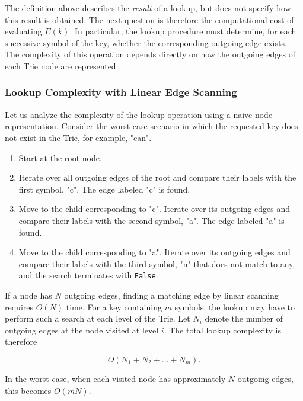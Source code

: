 \documentclass[pdflatex,sn-mathphys-num]{sn-jnl}%
\theoremstyle{thmstyleone}%
\theoremstyle{thmstyletwo}%
\theoremstyle{thmstylethree}%
\begin{document}
The definition above describes the \textit{result} of a lookup, but does not specify how
this result is obtained. The next question is therefore the computational cost of evaluating $E(k)$.
In particular, the lookup procedure must determine, for each successive symbol of the key, whether
the corresponding outgoing edge exists. The complexity of this operation depends directly on how
the outgoing edges of each Trie node are represented.


\subsubsection{Lookup Complexity with Linear Edge Scanning}
\label{lookup-complexity-with-linear-edge-scanning}

Let us analyze the complexity of the lookup operation \cite{largescalesearch2021} using a naive node representation.
Consider the worst-case scenario in which the requested key does not exist in the Trie, for example, "can".

\begin{enumerate}
  \def\labelenumi{\arabic{enumi}.}
\item Start at the root node.
\item Iterate over all outgoing edges of the root and compare their labels with the first symbol, "c".
 The edge labeled "c" is found.
\item Move to the child corresponding to "c".
Iterate over its outgoing edges and compare their labels with the second symbol, "a". The edge labeled "a" is found.
\item Move to the child corresponding to "a".
Iterate over its outgoing edges and compare their labels with the third symbol, "n" that does not match to any, and
the search terminates with \texttt{False}.
\end{enumerate}


If a node has $N$ outgoing edges, finding a matching edge by linear scanning requires $O(N)$ time.
For a key containing $m$ symbols, the lookup may have to perform such a search at each level of the Trie.
Let $N_i$ denote the number of outgoing edges at the node visited at level $i$. The total lookup complexity is therefore

\begin{equation}
O(N_1 + N_2 + \dots + N_m).
\end{equation}

In the worst case, when each visited node has approximately $N$ outgoing edges, this becomes $O(mN)$.
\end{document}
